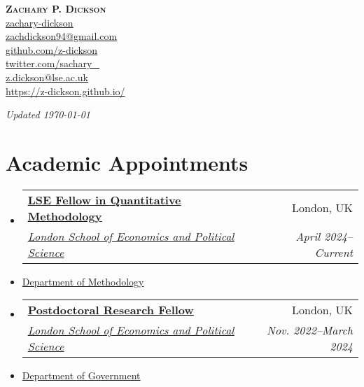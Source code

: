 \documentclass[letterpaper,11pt]{article}
\makeatletter
\newcommand{\resumeItem}[1]{
  \item\small{
    {#1 \vspace{-2pt}}
  }
}
\newcommand{\resumeSubheading}[4]{
  \vspace{-2pt}\item
    \begin{tabular*}{0.97\textwidth}[t]{l@{\extracolsep{\fill}}r}
      \textbf{#1} & #2 \\
      \textit{\small#3} & \textit{\small #4} \\
    \end{tabular*}\vspace{-7pt}
}
\newcommand{\resumeSubHeadingListStart}{\begin{itemize}[leftmargin=0.15in, label={}]}
\newcommand{\resumeSubHeadingListEnd}{\end{itemize}}
\makeatother
\begin{document}
\begin{center}
    

\textbf{\huge \scshape Zachary P. Dickson} \\
\bigskip
   \faLinkedin \href{https://www.linkedin.com/in/zachary-dickson-934b1381/}{\ul{ zachary-dickson}}\\
\faGooglePlus \href{mailto:zachdickson94@gmail.com}{\ul{ zachdickson94@gmail.com}}\\

 \faGithub \href{https://github.com/z-dickson}{\ul{ github.com/z-dickson}}\\
  \faTwitter \href{https://twitter.com/sachary_}{\ul{twitter.com/sachary\_}} \\
 
 \faEnvelope \href{mailto:z.dickson@LSE.ac.uk}{ z.dickson@lse.ac.uk} \\

 \href{https://z-dickson.github.io/}{\color{blue}https://z-dickson.github.io/}

\begin{flushright}
 \textit{Updated \today} 
\end{flushright}

\end{center}
\bigskip
\section{Academic Appointments}
  \resumeSubHeadingListStart
    \resumeSubheading    
      {\href{https://www.lse.ac.uk/Methodology/People/Academic-Staff/Zach-Dickson/Zach-Dickson}{\ul{LSE Fellow in Quantitative Methodology}}}{London, UK}
      {\href{https://www.lse.ac.uk/}{\ul{London School of Economics and Political Science}}}{April 2024--Current}
      \resumeItem{\href{https://www.lse.ac.uk/Methodology}{Department of Methodology}}           %
 \resumeSubHeadingListEnd

  \resumeSubHeadingListStart
    \resumeSubheading    
      {\href{https://www.lse.ac.uk/government/people/research-staff/zachary-dickson}{\ul{Postdoctoral Research Fellow}}}{London, UK}
      {\href{https://www.lse.ac.uk/}{\ul{London School of Economics and Political Science}}}{Nov. 2022--March 2024}
      \resumeItem{\href{https://www.lse.ac.uk/government}{Department of Government}}          %
 \resumeSubHeadingListEnd
\end{document}
